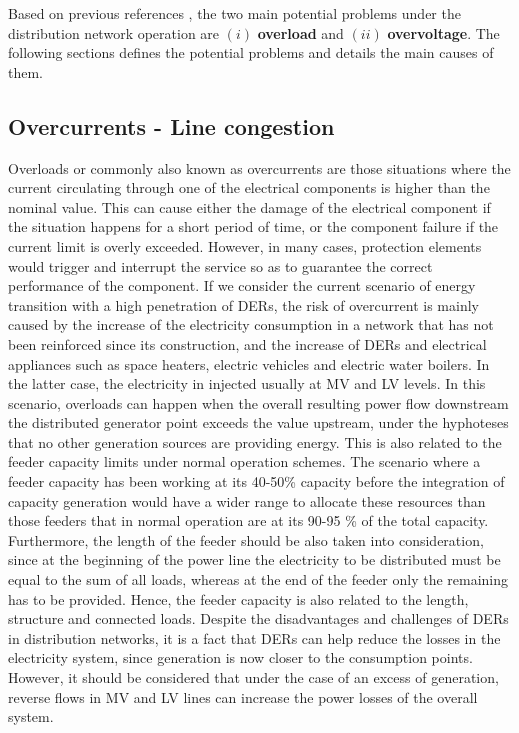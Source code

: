 Based on previous references \cite{ISMAEL20191002, Bollen2011}, the two main potential problems under the distribution network operation are $(i)$ \textbf{overload} and  $(ii)$ \textbf{overvoltage}. The following sections defines the potential problems and details the main causes of them. 


\subsection{Overcurrents - Line congestion}
Overloads or commonly also known as overcurrents are those situations where the current circulating through one of the electrical components is higher than the nominal value. This can cause either the damage of the electrical component if the situation happens for a short period of time, or the component failure if the current limit is overly exceeded. However, in many cases, protection elements would trigger and interrupt the service so as to guarantee the correct performance of the component. 
If we consider the current scenario of energy transition with a high penetration of DERs, the risk of overcurrent is mainly caused by the increase of the electricity consumption in a network that has not been reinforced since its construction, and the increase of DERs and electrical appliances such as space heaters, electric vehicles and electric water boilers. In the latter case, the electricity in injected usually at MV and LV levels. In this scenario, overloads can happen when the overall resulting power flow downstream the distributed generator point exceeds the value upstream, under the hyphoteses that no other generation sources are providing energy. This is also related to the feeder capacity limits under normal operation schemes. The scenario where a feeder capacity has been working at its 40-50\% capacity before the integration of capacity generation would have a wider range to allocate these resources than those feeders that in normal operation are at its 90-95 \% of the total capacity. Furthermore, the length of the feeder should be also taken into consideration, since at the beginning of the power line the electricity to be distributed must be equal to the sum of all loads, whereas at the end of the feeder only the remaining has to be provided. Hence, the feeder capacity is also related to the length, structure and connected loads. 
Despite the disadvantages and challenges of DERs in distribution networks, it is a fact that DERs can help reduce the losses in the electricity system, since generation is now closer to the consumption points. However, it should be considered that under the case of an excess of generation, reverse flows in MV and LV lines can increase the power losses of the overall system. 

